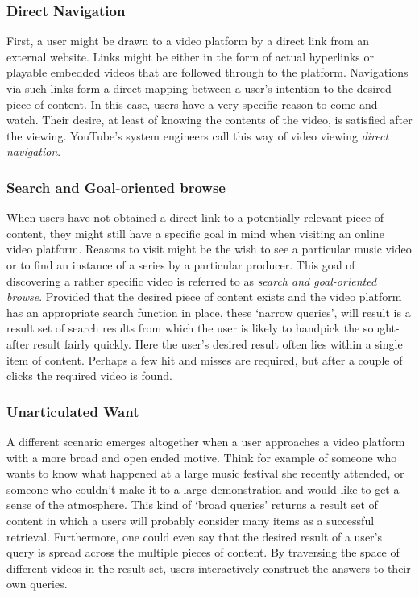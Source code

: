 \subsubsection{Direct Navigation}
First, a user might be drawn to a video platform by a direct link from an external website. Links might be either in the form of actual hyperlinks or playable embedded videos that are followed through to the platform. Navigations via such links form a direct mapping between a user's intention to the desired piece of content. In this case, users have a very specific reason to come and watch. Their desire, at least of knowing the contents of the video, is satisfied after the viewing. YouTube's system engineers call this way of video viewing \emph{direct navigation}\cite{Davidson:2010tu}.

\subsubsection{Search and Goal-oriented browse}
When users have not obtained a direct link to a potentially relevant piece of content, they might still have a specific goal in mind when visiting an online video platform. Reasons to visit might be the wish to see a particular music video or to find an instance of a series by a particular producer. This goal of discovering a rather specific video is referred to as \emph{search and goal-oriented browse}. Provided that the desired piece of content exists and the video platform has an appropriate search function in place, these `narrow queries', will result is a result set of search results from which the user is likely to handpick the sought-after result fairly quickly. Here the user's desired result often lies within a single item of content. Perhaps a few hit and misses are required, but after a couple of clicks the required video is found.

\subsubsection{Unarticulated Want}
A different scenario emerges altogether when a user approaches a video platform with a more broad and open ended motive. Think for example of someone who wants to know what happened at a large music festival she recently attended, or someone who couldn't make it to a large demonstration and would like to get a sense of the atmosphere. This kind of `broad queries' returns a result set of content in which a users will probably consider many items as a successful retrieval. Furthermore, one could even say that the desired result of a user's query is spread across the multiple pieces of content. By traversing the space of different videos in the result set, users interactively construct the answers to their own queries.

